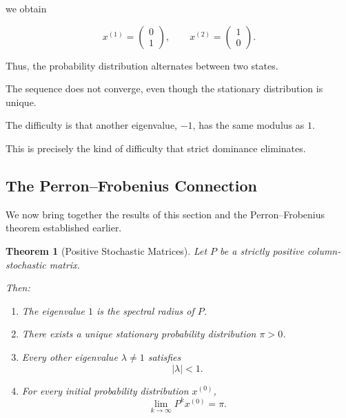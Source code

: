\documentclass[11pt,a4paper]{article}
\newtheorem{theorem}{Theorem}[section]
\theoremstyle{definition}
\theoremstyle{remark}
\begin{document}
we obtain

\[
x^{(1)}
=
\begin{pmatrix}
0\\
1
\end{pmatrix},
\qquad
x^{(2)}
=
\begin{pmatrix}
1\\
0
\end{pmatrix}.
\]

Thus, the probability
distribution alternates
between two states.

The sequence does not converge,
even though the stationary
distribution is unique.

The difficulty is that
another eigenvalue, $-1$,
has the same modulus as $1$.

This is precisely the
kind of difficulty that
strict dominance eliminates.

\subsection{The Perron--Frobenius Connection}

We now bring together
the results of this section
and the Perron--Frobenius
theorem established earlier.

\begin{theorem}[Positive Stochastic Matrices]

Let $P$ be a strictly
positive column-stochastic
matrix.

Then:

\begin{enumerate}

\item The eigenvalue $1$
is the spectral radius
of $P$.

\item There exists a unique
stationary probability
distribution $\pi>0$.

\item Every other eigenvalue
$\lambda\neq1$ satisfies
\[
|\lambda|<1.
\]

\item For every initial
probability distribution
$x^{(0)}$,
\[
\lim_{k\to\infty}
P^kx^{(0)}=\pi.
\]

\end{enumerate}

\end{theorem}
\end{document}
